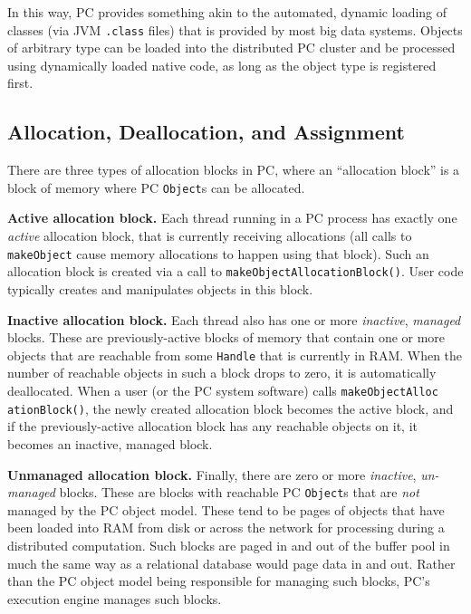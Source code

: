 In this way, PC provides something akin to the automated,
dynamic loading of classes (via JVM \texttt{.class} files) that is
provided by most big data systems.  
Objects of arbitrary type can be loaded into the distributed PC cluster and be
processed using dynamically loaded native code, as long
as the object type is registered first.

\subsection{Allocation, Deallocation, and Assignment}

There are three types of allocation blocks in PC, where an ``allocation block'' is a block of memory where PC \texttt{Object}s can be
allocated.

\vspace{5pt}
\noindent
\textbf{Active allocation block.} Each thread running in a PC process has exactly one \emph{active} allocation block, that is currently receiving allocations (all calls to
\texttt{makeObject} cause memory allocations to happen using that block).  Such an allocation block is created via a call to 
\texttt{makeObjectAllocationBlock()}.  User code typically creates and manipulates objects in this block.

\vspace{5pt}
\noindent
\textbf{Inactive allocation block.} Each thread also has one or more
\emph{inactive}, \emph{managed} blocks.  These are previously-active blocks of memory that contain one or more objects that are reachable
from some \texttt{Handle} that is currently in RAM.  When the number
of reachable objects in such a block drops to zero, it is automatically
deallocated.
When a user (or the PC system software) calls 
\texttt{makeObjectAlloc ationBlock()}, the newly created allocation block becomes the active block, and if the previously-active allocation block has any
reachable objects on it, it becomes an inactive, managed block.

\vspace{5pt}
\noindent
\textbf{Unmanaged allocation block.} Finally, there are zero or more \emph{inactive},
  \emph{un-managed} blocks.  These are blocks with reachable PC
  \texttt{Object}s that are \emph{not} managed by the PC object model.  These tend to be pages of objects that have
been loaded into RAM from disk or across the network for processing
during a distributed computation.  Such blocks are paged in and out of the
buffer pool in much the same way as a relational database would page data in and out.
Rather than the PC object model being responsible for managing such blocks, PC's execution engine manages such blocks.

